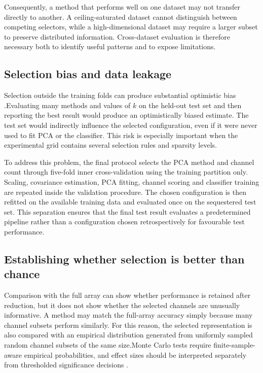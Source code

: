 Consequently, a method that performs well on one dataset may not transfer directly to another. A ceiling-saturated dataset cannot distinguish between competing selectors, while a high-dimensional dataset may require a larger subset to preserve distributed information. Cross-dataset evaluation is therefore necessary both to identify useful patterns and to expose limitations.

\subsection{Selection bias and data leakage}

Selection outside the training folds can produce substantial optimistic bias
\citep{ambroise2002selection,varma2006bias,cawley2010overfitting,
kaufman2012leakage,krstajic2014crossvalidation}.Evaluating many methods and values of $k$ on the held-out test set and then reporting the best result would produce an optimistically biased estimate. The test set would indirectly influence the selected configuration, even if it were never used to fit PCA or the classifier. This risk is especially important when the experimental grid contains several selection rules and sparsity levels.

To address this problem, the final protocol selects the PCA method and channel count through five-fold inner cross-validation using the training partition only. Scaling, covariance estimation, PCA fitting, channel scoring and classifier training are repeated inside the validation procedure. The chosen configuration is then refitted on the available training data and evaluated once on the sequestered test set. This separation ensures that the final test result evaluates a predetermined pipeline rather than a configuration chosen retrospectively for favourable test performance.

\subsection{Establishing whether selection is better than chance}

Comparison with the full array can show whether performance is retained after reduction, but it does not show whether the selected channels are unusually informative. A method may match the full-array accuracy simply because many channel subsets perform similarly. For this reason, the selected representation is also compared with an empirical distribution generated from uniformly sampled random channel subsets of the same size.Monte Carlo tests require finite-sample-aware empirical probabilities, and
effect sizes should be interpreted separately from thresholded significance
decisions
\citep{north2002permutation,phipson2010permutation,good2005permutation,
cohen1988power,lakens2013effect,wasserstein2016pvalue}.

